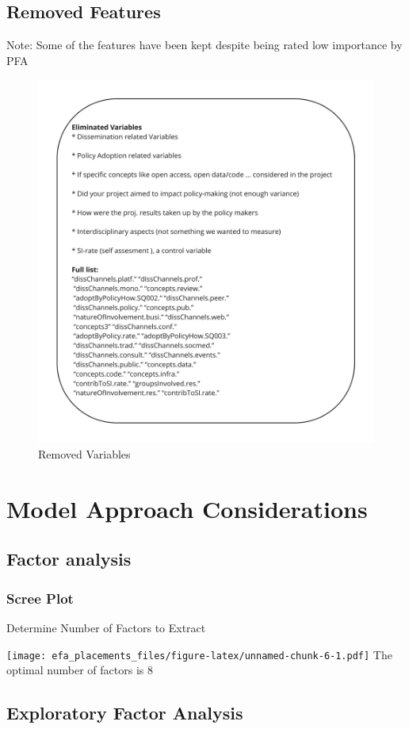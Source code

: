 \documentclass[
]{article}
\begin{document}
\hypertarget{removed-features}{%
\subsection{Removed Features}\label{removed-features}}

Note: Some of the features have been kept despite being rated low
importance by PFA

\begin{figure}

{\centering \includegraphics[width=0.3\linewidth]{../06_model/eliminated_variables} 

}

\caption{Removed Variables}\label{fig:unnamed-chunk-5}
\end{figure}

\hypertarget{model-approach-considerations}{%
\section{Model Approach
Considerations}\label{model-approach-considerations}}

\hypertarget{factor-analysis}{%
\subsection{Factor analysis}\label{factor-analysis}}

\hypertarget{scree-plot}{%
\subsubsection{Scree Plot}\label{scree-plot}}

Determine Number of Factors to Extract

\texttt{[image: efa\_placements\_files/figure-latex/unnamed-chunk-6-1.pdf]}
The optimal number of factors is 8

\hypertarget{exploratory-factor-analysis}{%
\subsection{Exploratory Factor
Analysis}\label{exploratory-factor-analysis}}
\end{document}
